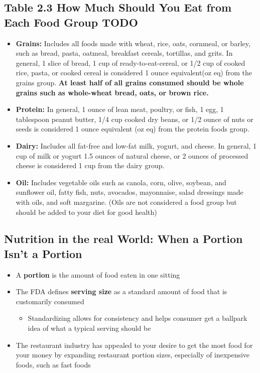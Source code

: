 \documentclass[12pt]{article}
\begin{document}
        \subsection{Table 2.3 How Much Should You Eat from Each Food Group TODO}
            \begin{itemize}
                \item \textbf{Grains:} Includes all foods made with wheat, rice, oats, cornmeal, or barley, such as bread, pasta, oatmeal, breakfast cereals, tortillas, and grits. In general, 1 slice of bread, 1 cup of ready-to-eat-cereal, or 1/2 cup of cooked rice, pasta, or cooked cereal is considered 1 ounce equivalent(oz eq) from the grains group. \textbf{At least half of all grains consumed should be whole grains such as whole-wheat bread, oats, or brown rice.}
                \item \textbf{Protein:} In general, 1 ounce of lean meat, poultry, or fish, 1 egg, 1 tablespoon peanut butter, 1/4 cup cooked dry beans, or 1/2 ounce of nuts or seeds is considered 1 ounce equivalent (oz eq) from the protein foods group.
                \item \textbf{Dairy:} Includes all fat-free and low-fat milk, yogurt, and cheese. In general, 1 cup of milk or yogurt 1.5 ounces of natural cheese, or 2 ounces of processed cheese is considered 1 cup from the dairy group.
                \item \textbf{Oil:} Includes vegetable oils such as canola, corn, olive, soybean, and sunflower oil, fatty fish, nuts, avocados, mayonnaise, salad dressings made with oils, and soft margarine. (Oils are not considered a food group but should be added to your diet for good health)
            \end{itemize}
        
        \subsection{Nutrition in the real World: When a Portion Isn't a Portion}
            \begin{itemize}
                \item A \textbf{portion} is the amount of food eaten in one sitting
                \item The FDA defines \textbf{serving size} as a standard amount of food that is customarily consumed
                    \begin{itemize}
                        \item Standardizing allows for consistency and helps consumer get a ballpark idea of what a typical serving should be
                    \end{itemize}
                \item The restaurant industry has appealed to your desire to get the most food for your money by expanding restaurant portion sizes, especially of inexpensive foods, such as fast foods
            \end{itemize}
\end{document}
